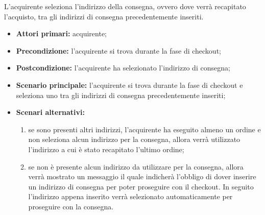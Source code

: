 L'acquirente seleziona l'indirizzo della consegna, ovvero dove verrà recapitato l'acquisto, tra gli indirizzi di consegna precedentemente inseriti.
\begin{itemize}
    \item \textbf{Attori primari:} acquirente;
    \item \textbf{Precondizione:} l'acquirente si trova durante la fase di checkout;
    \item \textbf{Postcondizione:} l'acquirente ha selezionato l'indirizzo di consegna;
    \item \textbf{Scenario principale:} l'acquirente si trova durante la fase di checkout e seleziona uno tra gli indirizzi di consegna precedentemente inseriti;
    \item \textbf{Scenari alternativi:}
    \begin{enumerate}[label=\lett]
        \item se sono presenti altri indirizzi, l'acquirente ha eseguito almeno un ordine e non seleziona alcun indirizzo per la consegna, allora verrà utilizzato l'indirizzo a cui è stato recapitato l'ultimo ordine;
        \item se non è presente alcun indirizzo da utilizzare per la consegna, allora verrà mostrato un messaggio il quale indicherà l'obbligo di dover inserire un indirizzo di consegna per poter proseguire con il checkout. In seguito l'indirizzo appena inserito verrà selezionato automaticamente per proseguire con la consegna.
    \end{enumerate}
\end{itemize}

